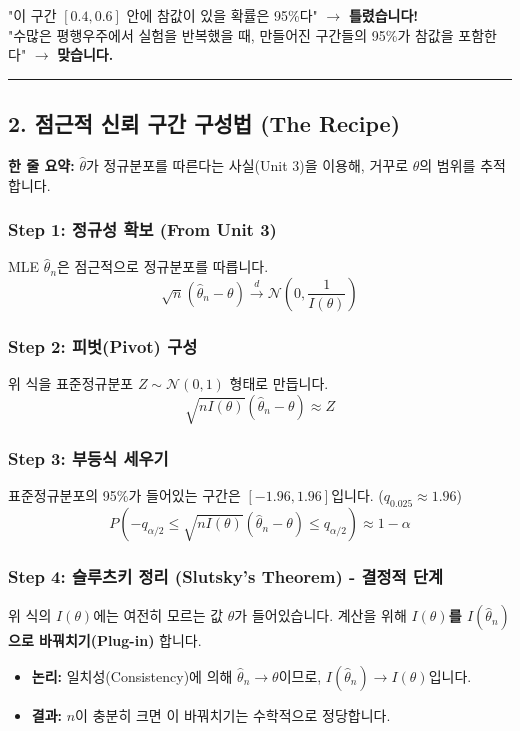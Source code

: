 \documentclass[11pt,a4paper]{book}
\theoremstyle{definition}
\begin{document}
\begin{warningbox}[title={오개념 주의: Frequentist View}]
"이 구간 $[0.4, 0.6]$ 안에 참값이 있을 확률은 95\%다" $\rightarrow$ \textbf{틀렸습니다!} \\
"수많은 평행우주에서 실험을 반복했을 때, 만들어진 구간들의 95\%가 참값을 포함한다" $\rightarrow$ \textbf{맞습니다.}
\end{warningbox}

\vspace{0.5cm}\hrule\vspace{0.5cm}

\subsection{2. 점근적 신뢰 구간 구성법 (The Recipe)}


\begin{conceptbox}[title={개념 2: 정규분포를 역이용하여 구간 만들기}]
\textbf{한 줄 요약:} $\hat{\theta}$가 정규분포를 따른다는 사실(Unit 3)을 이용해, 거꾸로 $\theta$의 범위를 추적합니다.
\end{conceptbox}

\subsubsection*{Step 1: 정규성 확보 (From Unit 3)}
MLE $\hat{\theta}_n$은 점근적으로 정규분포를 따릅니다.
$$ \sqrt{n}(\hat{\theta}_n - \theta) \xrightarrow{d} \mathcal{N}\left(0, \frac{1}{I(\theta)}\right) $$

\subsubsection*{Step 2: 피벗(Pivot) 구성}
위 식을 표준정규분포 $Z \sim \mathcal{N}(0, 1)$ 형태로 만듭니다.
$$ \sqrt{n I(\theta)} (\hat{\theta}_n - \theta) \approx Z $$

\subsubsection*{Step 3: 부등식 세우기}
표준정규분포의 95\%가 들어있는 구간은 $[-1.96, 1.96]$입니다. ($q_{0.025} \approx 1.96$)
$$ P\left( -q_{\alpha/2} \le \sqrt{n I(\theta)} (\hat{\theta}_n - \theta) \le q_{\alpha/2} \right) \approx 1 - \alpha $$

\subsubsection*{Step 4: 슬루츠키 정리 (Slutsky's Theorem) - 결정적 단계}
위 식의 $I(\theta)$에는 여전히 모르는 값 $\theta$가 들어있습니다. 계산을 위해 \textbf{$I(\theta)$를 $I(\hat{\theta}_n)$으로 바꿔치기(Plug-in)} 합니다.
\begin{itemize}
    \item \textbf{논리:} 일치성(Consistency)에 의해 $\hat{\theta}_n \to \theta$이므로, $I(\hat{\theta}_n) \to I(\theta)$입니다.
    \item \textbf{결과:} $n$이 충분히 크면 이 바꿔치기는 수학적으로 정당합니다.
\end{itemize}
\end{document}
